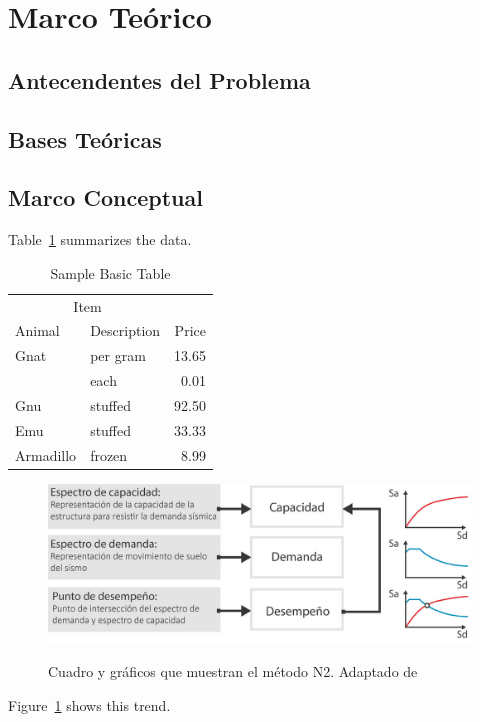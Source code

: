 \section{Marco Teórico}

\subsection{Antecendentes del Problema}

\lipsum[15]

\lipsum[15]

\subsection{Bases Teóricas}

\lipsum[2]

\subsection{Marco Conceptual}

Table~\ref{tab:BasicTable} summarizes the data. \lipsum[15]

\begin{table}
  \caption{Sample Basic Table}
  \label{tab:BasicTable}
  \begin{tabular}{@{}llr@{}}         \toprule
  \multicolumn{2}{c}{Item}        \\ \cmidrule(r){1-2}
  Animal    & Description & Price \\ \midrule
  Gnat      & per gram    & 13.65 \\
            & each        &  0.01 \\
  Gnu       & stuffed     & 92.50 \\
  Emu       & stuffed     & 33.33 \\
  Armadillo & frozen      &  8.99 \\ \bottomrule
  \end{tabular}
\end{table}

\begin{figure}[ht]
  \caption{Cuadro y gráficos que muestran el método N2. Adaptado de \cite{deWaal2009}}
  \includegraphics[scale=0.36]{E_IMAGENES/3_Capitulo3/Cap3_Imagen70.png}
	\label{fig:Figure12}
\end{figure}

Figure~\ref{fig:Figure12} shows this trend. \lipsum[16]
